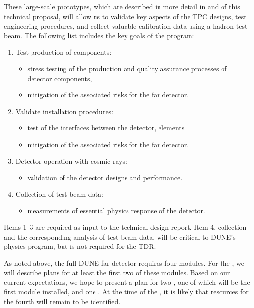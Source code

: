 These large-scale prototypes, which are described in more detail in 
\voltitlespfd and \voltitledpfd %
of this technical proposal, will allow us to validate key aspects of the TPC designs, test engineering procedures, and collect valuable calibration data using a hadron test beam. The following list includes the key goals of the  program:
\begin{enumerate}
\item Test production of components:
\begin{itemize}
\item stress testing of the production and quality
assurance processes of detector components,
\item mitigation of the associated risks for the far detector.
\end{itemize}
\item Validate installation procedures:
\begin{itemize}
\item test of the interfaces between the detector,
elements
\item mitigation of the associated risks for the far detector.
\end{itemize}
\item Detector operation with cosmic rays:
\begin{itemize}
\item validation of the detector designs and
performance.
\end{itemize}
\item Collection of test beam data:
\begin{itemize}
\item measurements of essential physics response of the detector.
\end{itemize}
\end{enumerate}

Items \numrange{1}{3} are required as input to the technical design report. Item 4, collection and the corresponding analysis of test beam data, will be critical to DUNE's physics program, but is not required for the TDR.

As noted above, the full DUNE far detector requires four modules. For the , we will describe plans for at least the first two of these modules. Based on our current expectations, we hope to present a plan for two , one of which will be the first module installed, and one . At the time of the , it is likely that resources for the fourth  will remain to be identified. 


